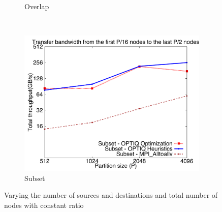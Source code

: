 \begin{figure}[!htbp]
\begin{subfigure}[b]{0.32\textwidth}
                \caption{Overlap}
                \label{fig:constantr_overlap_msg}
        \end{subfigure}
        ~ %
        \begin{subfigure}[b]{0.32\textwidth}
                \includegraphics[width=\textwidth]{figures/constantr_subset_msg.pdf}
                \caption{Subset}
                \label{fig:constantr_subset_msg}
        \end{subfigure}
        \caption{Varying the number of sources and destinations and total number of nodes with constant ratio}
        \label{fig:constantr_msg}
\end{figure}
